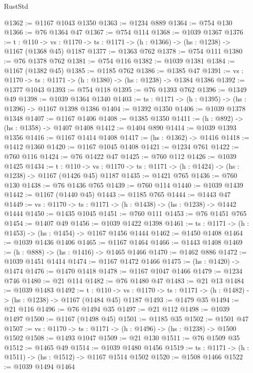 \begin{lexlean}{RustStd}
\begin{coremodule}
@1362 := @1167 @1043 @1350
@1363 := @1234 @889
@1364 := @754 @130
@1366 := @76 @1364 @47
@1367 := @754 @114
@1368 := @1039 @1367
@1376 := {t : @110} ->
  {vs : @1170} -> {ts : @1171} -> (h : @1366) -> (hs : @1238) -> @1167 (@1368 @45) @1187
@1377 := @1363 @762
@1378 := @754 @111
@1380 := @76 @1378 @762
@1381 := @754 @116
@1382 := @1039 @1381
@1384 := @1167 (@1382 @45)
@1385 := @1185 @762
@1386 := @1385 @47
@1391 := {vs : @1170} -> {ts : @1171} -> (h : @1380) -> (hs : @1238) -> @1384 @1386
@1392 := @1377 @1043
@1393 := @754 @118
@1395 := @76 @1393 @762
@1396 := @1349 @49
@1398 := @1039 @1364 @1340
@1403 := {ts : @1171} -> (h : @1395) -> (hs : @1396) -> @1167 @1398 @1386
@1404 := @1392 @1350
@1406 := @1039 @1378 @1348
@1407 := @1167 @1406
@1408 := @1385 @1350
@1411 := (h : @892) -> (hs : @1358) -> @1407 @1408
@1412 := @1404 @890
@1414 := @1039 @1393 @1356
@1416 := @1167 @1414 @1408
@1417 := (hs : @1362) -> @1416
@1418 := @1412 @1360
@1420 := @1167 @1045 @1408
@1421 := @1234 @761
@1422 := @760 @116
@1424 := @76 @1422 @47
@1425 := @760 @112
@1426 := @1039 @1425
@1434 := {t : @110} ->
  {vs : @1170} -> {ts : @1171} -> (h : @1424) -> (hs : @1238) -> @1167 (@1426 @45) @1187
@1435 := @1421 @765
@1436 := @760 @130
@1438 := @76 @1436 @765
@1439 := @760 @114
@1440 := @1039 @1439
@1442 := @1167 (@1440 @45)
@1443 := @1185 @765
@1444 := @1443 @47
@1449 := {vs : @1170} -> {ts : @1171} -> (h : @1438) -> (hs : @1238) -> @1442 @1444
@1450 := @1435 @1045
@1451 := @760 @111
@1453 := @76 @1451 @765
@1454 := @1407 @49
@1456 := @1039 @1422 @1398
@1461 := {ts : @1171} -> (h : @1453) -> (hs : @1454) -> @1167 @1456 @1444
@1462 := @1450 @1408
@1464 := @1039 @1436 @1406
@1465 := @1167 @1464
@1466 := @1443 @1408
@1469 := (h : @888) -> (hs : @1416) -> @1465 @1466
@1470 := @1462 @886
@1472 := @1039 @1451 @1414
@1474 := @1167 @1472 @1466
@1475 := (hs : @1420) -> @1474
@1476 := @1470 @1418
@1478 := @1167 @1047 @1466
@1479 := @1234 @746
@1480 := @21 @114
@1482 := @76 @1480 @47
@1483 := @21 @13
@1484 := @1039 @1483
@1492 := {t : @110} ->
  {vs : @1170} -> {ts : @1171} -> (h : @1482) -> (hs : @1238) -> @1167 (@1484 @45) @1187
@1493 := @1479 @35
@1494 := @21 @116
@1496 := @76 @1494 @35
@1497 := @21 @112
@1498 := @1039 @1497
@1500 := @1167 (@1498 @45)
@1501 := @1185 @35
@1502 := @1501 @47
@1507 := {vs : @1170} -> {ts : @1171} -> (h : @1496) -> (hs : @1238) -> @1500 @1502
@1508 := @1493 @1047
@1509 := @21 @130
@1511 := @76 @1509 @35
@1512 := @1465 @49
@1514 := @1039 @1480 @1456
@1519 := {ts : @1171} -> (h : @1511) -> (hs : @1512) -> @1167 @1514 @1502
@1520 := @1508 @1466
@1522 := @1039 @1494 @1464

\end{coremodule}
\end{lexlean}

